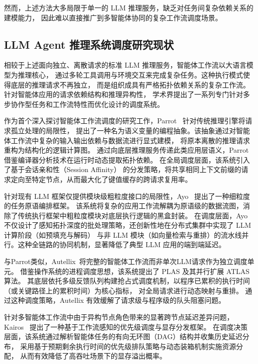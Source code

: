 然而，上述方法大多局限于单一的 LLM 推理服务，缺乏对任务间复杂依赖关系的建模能力，
因此难以直接推广到多智能体协同的复杂工作流调度场景。

\subsection{LLM Agent 推理系统调度研究现状}\label{subsec:agent-sched}

相较于上述面向独立、离散请求的标准 LLM 推理服务，智能体工作流以大语言模型为推理核心，
通过多轮工具调用与环境交互来完成复杂任务。这种执行模式使得底层的推理请求不再独立，
而是组织成具有严格拓扑依赖关系的复杂工作流。
针对智能体应用的请求依赖结构和推理异构性，
学术界提出了一系列专门针对多步协作型任务和工作流特性而优化设计的调度系统。

作为首个深入探讨智能体工作流调度的研究工作，Parrot~\cite{lin2024parrot} 针对传统推理引擎将请求孤立处理的局限性，
提出了一种名为语义变量的编程抽象。该抽象通过对智能体工作流中复杂的输入输出依赖与数据流进行显式建模，
将原本离散的推理请求重构为结构化的逻辑计算图。
通过向底层推理服务传递此类应用层语义，Parrot 借鉴编译器分析技术在运行时动态提取拓扑依赖。
在全局调度层面，该系统引入了基于会话亲和性（Session Affinity）
的分发策略，将共享相同上下文前缀的请求定向至特定节点，从而最大化了键值缓存的跨请求复用率。

针对现有 LLM 框架仅提供模块级粗粒度接口的局限性，Ayo~\cite{tan2025towards} 提出了一种细粒度的任务原语编排框架。
该系统将复杂的应用工作流解耦为原语级的数据流图，消除了传统执行框架中粗粒度模块对底层执行逻辑的黑盒封装。
在调度层面，Ayo 不仅设计了感知拓扑深度的批处理策略，还创新性地在分布式集群中实现了 LLM 计算阶段（如预填充与解码）
与非 LLM 模块（如向量检索与重排）的流水线并行。这种全链路的协同机制，显著降低了典型 LLM 应用的端到端延迟。

与Parrot类似，Autellix~\cite{luo2025autellix}将完整的智能体工作流而非单次LLM请求作为独立调度单元。
借鉴操作系统的进程调度思想，该系统提出了 PLAS 及其并行扩展 ATLAS 算法。
其底层依托多级反馈队列构建抢占式调度机制，以程序已累积的执行时间（或关键路径上的累积时间）为核心指标，
对全局请求进行动态映射与重排。
通过这种调度策略，Autellix 有效缓解了请求级与程序级的队头阻塞问题。

针对多智能体工作流中由于异构节点角色带来的显著跨节点延迟差异问题，
Kairos~\cite{chen2025kairos} 提出了一种基于工作流感知的优先级调度与显存分发框架。
在调度决策层面，该系统通过解析智能体任务的有向无环图（DAG）结构并收集历史延迟分布，
采用基于预期剩余执行时间的优先级排队策略与动态装箱机制实施资源分配，
从而有效降低了高吞吐场景下的显存溢出概率。

